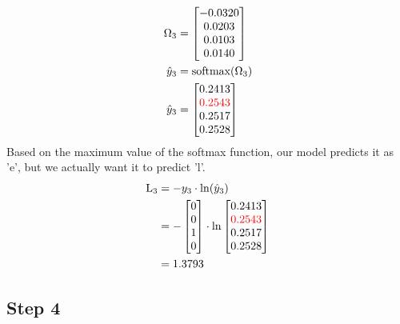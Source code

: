 \documentclass{article}
\begin{document}
\begin{align*}
    \Omega_3 & = \begin{bmatrix}
-0.0320 \\
0.0203\\
0.0103\\
 0.0140\\
\end{bmatrix} \\
    \hat{y}_3 & = \text{softmax}(\Omega_3) \\
    \hat{y}_3 & = \begin{bmatrix}
  0.2413 \\
  \textcolor{red}{ 0.2543} \\
 0.2517 \\
 0.2528 \\
\end{bmatrix}
\end{align*}
Based on the maximum value of the softmax function, our model predicts it as 'e', but we actually want it to predict 'l'.
\begin{align*}
    \text{L}_{3} & = -y_3 \cdot \ln(\hat{y}_3) \\
    &=-\begin{bmatrix} 0 \\ 0 \\ 1 \\ 0 \end{bmatrix} \cdot \ln{\begin{bmatrix}
  0.2413 \\
  \textcolor{red}{ 0.2543} \\
 0.2517 \\
 0.2528 \\
\end{bmatrix}}\\
    &=1.3793
\end{align*}
\subsection{Step 4}
\end{document}
